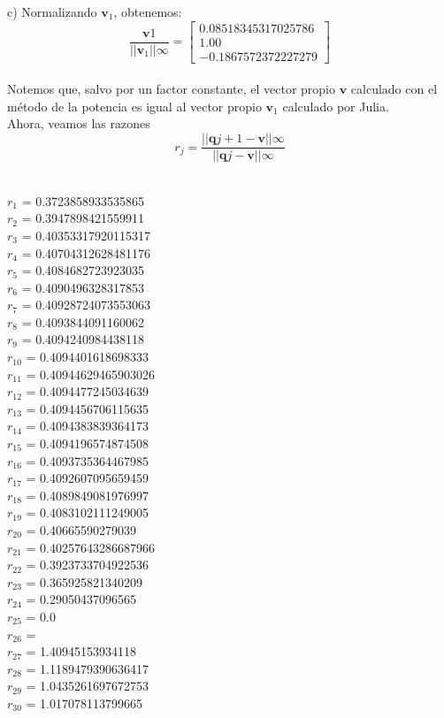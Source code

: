 \documentclass[11pt]{article}
\begin{document}
 c) Normalizando $\textbf{v}_1$, obtenemos:
 $$\frac{\textbf{v}1}{||\textbf{v}_1||\infty} =
\begin{bmatrix}
0.08518345317025786 \\
1.00 \\
-0.1867572372227279
\end{bmatrix}$$
\\

Notemos que, salvo por un factor constante, el vector propio $\textbf{v}$ calculado con el método de la potencia es igual al vector propio $\textbf{v}_1$ calculado por Julia.
\\

Ahora, veamos las razones
$$
r_j = \frac{||\textbf{q}{j+1} - \textbf{v}||\infty}{||\textbf{q}{j} - \textbf{v}||\infty}
$$
\\

\begin{multicols}{3}
\noindent
$r_1$ = 0.3723858933535865 \\
$r_2$ = 0.3947898421559911 \\
$r_3$ = 0.40353317920115317 \\
$r_4$ = 0.40704312628481176 \\
$r_5$ = 0.4084682723923035 \\
$r_6$ = 0.4090496328317853 \\
$r_7$ = 0.40928724073553063 \\
$r_8$ = 0.4093844091160062 \\
$r_9$ = 0.4094240984438118 \\
$r_{10}$ = 0.4094401618698333 \\
$r_{11}$ = 0.40944629465903026 \\
$r_{12}$ = 0.4094477245034639 \\
$r_{13}$ = 0.4094456706115635 \\
$r_{14}$ = 0.4094383839364173 \\
$r_{15}$ = 0.4094196574874508 \\
$r_{16}$ = 0.4093735364467985 \\
$r_{17}$ = 0.4092607095659459 \\
$r_{18}$ = 0.4089849081976997 \\
$r_{19}$ = 0.4083102111249005 \\
$r_{20}$ = 0.40665590279039 \\
$r_{21}$ = 0.40257643286687966 \\
$r_{22}$ = 0.3923733704922536 \\
$r_{23}$ = 0.365925821340209 \\
$r_{24}$ = 0.29050437096565 \\
$r_{25}$ = 0.0 \\
$r_{26}$ =  \\
$r_{27}$ = 1.40945153934118 \\
$r_{28}$ = 1.1189479390636417 \\
$r_{29}$ = 1.0435261697672753 \\
$r_{30}$ = 1.017078113799665 \\
\end{multicols}
\end{document}
